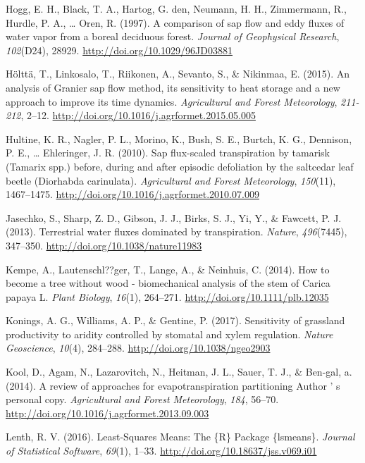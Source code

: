 \documentclass[11pt,twoside]{reedthesis}
\begin{document}
\hypertarget{ref-Hogg1997}{}
Hogg, E. H., Black, T. A., Hartog, G. den, Neumann, H. H., Zimmermann,
R., Hurdle, P. A., \ldots{} Oren, R. (1997). A comparison of sap flow
and eddy fluxes of water vapor from a boreal deciduous forest.
\emph{Journal of Geophysical Research}, \emph{102}(D24), 28929.
\url{http://doi.org/10.1029/96JD03881}

\hypertarget{ref-Holtta2015}{}
Hölttä, T., Linkosalo, T., Riikonen, A., Sevanto, S., \& Nikinmaa, E.
(2015). An analysis of Granier sap flow method, its sensitivity to heat
storage and a new approach to improve its time dynamics.
\emph{Agricultural and Forest Meteorology}, \emph{211-212}, 2--12.
\url{http://doi.org/10.1016/j.agrformet.2015.05.005}

\hypertarget{ref-Hultine2010}{}
Hultine, K. R., Nagler, P. L., Morino, K., Bush, S. E., Burtch, K. G.,
Dennison, P. E., \ldots{} Ehleringer, J. R. (2010). Sap flux-scaled
transpiration by tamarisk (Tamarix spp.) before, during and after
episodic defoliation by the saltcedar leaf beetle (Diorhabda
carinulata). \emph{Agricultural and Forest Meteorology}, \emph{150}(11),
1467--1475. \url{http://doi.org/10.1016/j.agrformet.2010.07.009}

\hypertarget{ref-Jasechko2013}{}
Jasechko, S., Sharp, Z. D., Gibson, J. J., Birks, S. J., Yi, Y., \&
Fawcett, P. J. (2013). Terrestrial water fluxes dominated by
transpiration. \emph{Nature}, \emph{496}(7445), 347--350.
\url{http://doi.org/10.1038/nature11983}

\hypertarget{ref-Kempe2014}{}
Kempe, A., Lautenschl??ger, T., Lange, A., \& Neinhuis, C. (2014). How
to become a tree without wood - biomechanical analysis of the stem of
Carica papaya L. \emph{Plant Biology}, \emph{16}(1), 264--271.
\url{http://doi.org/10.1111/plb.12035}

\hypertarget{ref-Konings2017}{}
Konings, A. G., Williams, A. P., \& Gentine, P. (2017). Sensitivity of
grassland productivity to aridity controlled by stomatal and xylem
regulation. \emph{Nature Geoscience}, \emph{10}(4), 284--288.
\url{http://doi.org/10.1038/ngeo2903}

\hypertarget{ref-Kool2014}{}
Kool, D., Agam, N., Lazarovitch, N., Heitman, J. L., Sauer, T. J., \&
Ben-gal, a. (2014). A review of approaches for evapotranspiration
partitioning Author ' s personal copy. \emph{Agricultural and Forest
Meteorology}, \emph{184}, 56--70.
\url{http://doi.org/10.1016/j.agrformet.2013.09.003}

\hypertarget{ref-Lenth2016}{}
Lenth, R. V. (2016). Least-Squares Means: The \{R\} Package \{lsmeans\}.
\emph{Journal of Statistical Software}, \emph{69}(1), 1--33.
\url{http://doi.org/10.18637/jss.v069.i01}
\end{document}
